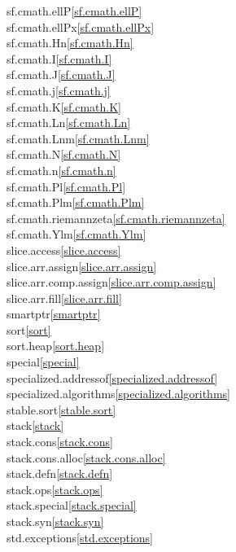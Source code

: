 \begin{multicols}{2}
sf.cmath.ellP\quad\ref{sf.cmath.ellP}\\
sf.cmath.ellPx\quad\ref{sf.cmath.ellPx}\\
sf.cmath.Hn\quad\ref{sf.cmath.Hn}\\
sf.cmath.I\quad\ref{sf.cmath.I}\\
sf.cmath.J\quad\ref{sf.cmath.J}\\
sf.cmath.j\quad\ref{sf.cmath.j}\\
sf.cmath.K\quad\ref{sf.cmath.K}\\
sf.cmath.Ln\quad\ref{sf.cmath.Ln}\\
sf.cmath.Lnm\quad\ref{sf.cmath.Lnm}\\
sf.cmath.N\quad\ref{sf.cmath.N}\\
sf.cmath.n\quad\ref{sf.cmath.n}\\
sf.cmath.Pl\quad\ref{sf.cmath.Pl}\\
sf.cmath.Plm\quad\ref{sf.cmath.Plm}\\
sf.cmath.riemannzeta\quad\ref{sf.cmath.riemannzeta}\\
sf.cmath.Ylm\quad\ref{sf.cmath.Ylm}\\
slice.access\quad\ref{slice.access}\\
slice.arr.assign\quad\ref{slice.arr.assign}\\
slice.arr.comp.assign\quad\ref{slice.arr.comp.assign}\\
slice.arr.fill\quad\ref{slice.arr.fill}\\
smartptr\quad\ref{smartptr}\\
sort\quad\ref{sort}\\
sort.heap\quad\ref{sort.heap}\\
special\quad\ref{special}\\
specialized.addressof\quad\ref{specialized.addressof}\\
specialized.algorithms\quad\ref{specialized.algorithms}\\
stable.sort\quad\ref{stable.sort}\\
stack\quad\ref{stack}\\
stack.cons\quad\ref{stack.cons}\\
stack.cons.alloc\quad\ref{stack.cons.alloc}\\
stack.defn\quad\ref{stack.defn}\\
stack.ops\quad\ref{stack.ops}\\
stack.special\quad\ref{stack.special}\\
stack.syn\quad\ref{stack.syn}\\
std.exceptions\quad\ref{std.exceptions}\\

\end{multicols}
